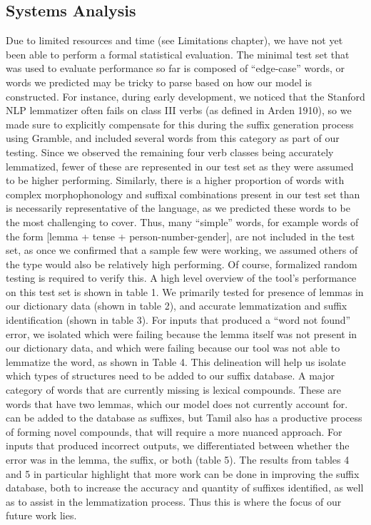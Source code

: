 \documentclass[11pt]{article}
\begin{document}
\subsection{Systems Analysis}
Due to limited resources and time (see Limitations chapter), 
we have not yet been able to perform a formal statistical evaluation. 
The minimal test set that was used to evaluate performance so far is 
composed of “edge-case” words, or words we predicted may be tricky to 
parse based on how our model is constructed. For instance, during early 
development, we noticed that the Stanford NLP lemmatizer often fails on 
class III verbs (as defined in Arden 1910), so we made sure to explicitly 
compensate for this during the suffix generation process using Gramble, 
and included several words from this category as part of our testing. 
Since we observed the remaining four verb classes \citep{arden_progressive_1910} being 
accurately lemmatized, fewer of these are represented in our test set 
as they were assumed to be higher performing. Similarly, there is a 
higher proportion of words with complex morphophonology and suffixal 
combinations present in our test set than is necessarily representative 
of the language, as we predicted these words to be the most challenging 
to cover. Thus, many “simple” words, for example words of the 
form [lemma + tense + person-number-gender], are not included in the test set, 
as once we confirmed that a sample few were working, we assumed others of the 
type would also be relatively high performing. Of course, formalized 
random testing is required to verify this. A high level overview of the 
tool’s performance on this test set is shown in table 1.
We primarily tested for presence of lemmas in our dictionary data (shown in table 2), 
and accurate lemmatization and suffix identification (shown in table 3). 
For inputs that produced a “word not found” error, we isolated which were 
failing because the lemma itself was not present in our dictionary data, 
and which were failing because our tool was not able to lemmatize the word, 
as shown in Table 4. This delineation will help us isolate which types of 
structures need to be added to our suffix database. 
A major category of words that are currently missing is lexical compounds. 
These are words that have two lemmas, which our model does not currently account for. 
can be added to the database as suffixes, but Tamil also has a 
productive process of forming novel compounds, that will require a more nuanced approach.
For inputs that produced incorrect outputs, we differentiated between 
whether the error was in the lemma, the suffix, or both (table 5). 
The results from tables 4 and 5 in particular highlight that more 
work can be done in improving the suffix database, both to increase 
the accuracy and quantity of suffixes identified, as well as to assist 
in the lemmatization process. Thus this is where the focus of our future work lies.
\end{document}
